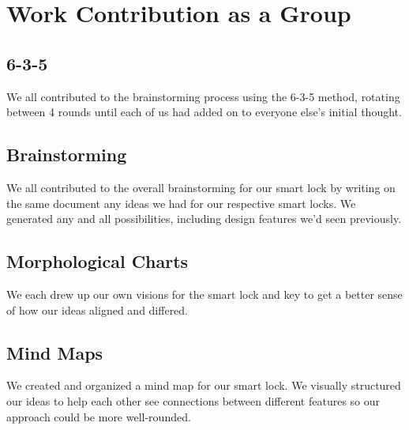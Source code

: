 \section{Work Contribution as a Group}

\subsection*{6-3-5}
We all contributed to the brainstorming process using the 6-3-5 method, rotating between 4 rounds until each of us had added on to everyone else's initial thought. 

\subsection*{Brainstorming}
We all contributed to the overall brainstorming for our smart lock by writing on the same document any ideas we had for our respective smart locks. We generated any and all possibilities, including design features we'd seen previously. 

\subsection*{Morphological Charts}
We each drew up our own visions for the smart lock and key to get a better sense of how our ideas aligned and differed.

\subsection*{Mind Maps}
We created and organized a mind map for our smart lock. We visually structured our ideas to help each other see connections between different features so our approach could be more well-rounded.